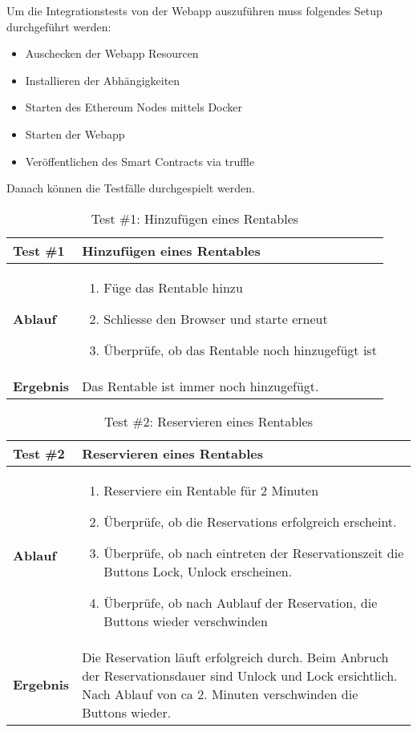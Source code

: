 Um die Integrationstests von der Webapp auszuführen muss folgendes Setup durchgeführt werden:

\begin{itemize}
    \item Auschecken der Webapp Resourcen
    \item Installieren der Abhängigkeiten
    \item Starten des Ethereum Nodes mittels Docker
    \item Starten der Webapp
    \item Veröffentlichen des Smart Contracts via truffle 
\end{itemize}

Danach können die Testfälle durchgespielt werden.


\begin{table}[H]
\centering
\caption{Test \#1: Hinzufügen eines Rentables }
\label{my-label}
\begin{tabular}{@{}L{1.6cm}L{11cm}@{}}
\toprule
\textbf{Test \#1}
& Hinzufügen eines Rentables
\\ \midrule
\textbf{Ablauf}
& 
\begin{enumerate}
    \item Füge das Rentable hinzu
    \item Schliesse den Browser und starte erneut
    \item Überprüfe, ob das Rentable noch hinzugefügt ist
\end{enumerate}
\\ \midrule
\textbf{Ergebnis}
& Das Rentable ist immer noch hinzugefügt.
\\ \bottomrule
\end{tabular}
\end{table}


\begin{table}[H]
\centering
\caption{Test \#2: Reservieren eines Rentables }
\label{my-label}
\begin{tabular}{@{}L{1.6cm}L{11cm}@{}}
\toprule
\textbf{Test \#2}
& Reservieren eines Rentables
\\ \midrule
\textbf{Ablauf}
& 
\begin{enumerate}
    \item Reserviere ein Rentable für 2 Minuten
    \item Überprüfe, ob die Reservations erfolgreich erscheint.
    \item Überprüfe, ob nach eintreten der Reservationszeit die Buttons Lock, Unlock erscheinen.
    \item Überprüfe, ob nach Aublauf der Reservation, die Buttons wieder verschwinden
\end{enumerate}
\\ \midrule
\textbf{Ergebnis}
& Die Reservation läuft erfolgreich durch. Beim Anbruch der Reservationsdauer sind Unlock und Lock ersichtlich. Nach Ablauf von ca 2. Minuten verschwinden die Buttons wieder. 
\\ \bottomrule
\end{tabular}
\end{table}


